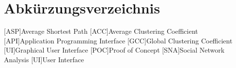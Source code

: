 \chapter*{Abkürzungsverzeichnis}

\begin{acronym}
    [ASP]{Average Shortest Path}
    [ACC]{Average Clustering Coefficient}
    [API]{Application Programming Interface}
    [GCC]{Global Clustering Coefficient}
    [UI]{Graphical User Interface}
    [POC]{Proof of Concept}
    [SNA]{Social Network Analysis}
    [UI]{User Interface}
\end{acronym}
